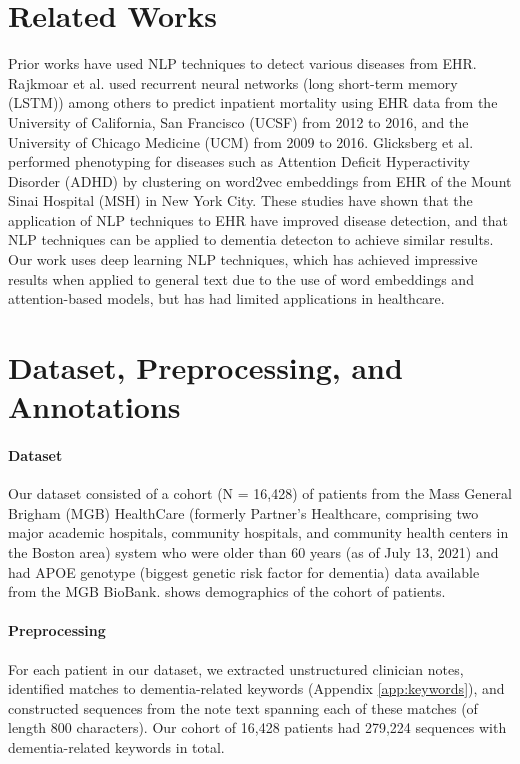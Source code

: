 \documentclass[pmlr,twocolumn,10pt]{jmlr} %
\begin{document}
\section{Related Works}
\label{sec:RelatedWorks} 
Prior works have used NLP techniques to detect various diseases from EHR. Rajkmoar et al. %
used recurrent neural networks (long short-term memory (LSTM)) among others to predict inpatient mortality using EHR data from the University of California, San Francisco (UCSF) from 2012 to 2016, and the University of Chicago Medicine (UCM) from 2009 to 2016.  Glicksberg et al. %
performed phenotyping for diseases such as Attention Deficit Hyperactivity Disorder (ADHD) by clustering on word2vec embeddings from EHR of the Mount Sinai Hospital (MSH) in New York City. These studies have shown that the application of NLP techniques to EHR have improved disease detection, and that NLP techniques can be applied to dementia detecton to achieve similar results. Our work uses deep learning NLP techniques, which has achieved impressive results when applied to general text due to the use of word embeddings and attention-based models, but has had limited applications in healthcare. %

\section{Dataset, Preprocessing, and Annotations}
\label{sec:Dataset+Preprocessing+Annotations}

\paragraph{Dataset}
\label{sec:Dataset} Our dataset consisted of a cohort (N = 16,428) of patients from the Mass General Brigham (MGB) HealthCare (formerly Partner's Healthcare, comprising two major academic hospitals, community hospitals, and community health centers in the Boston area) system who were older than 60 years (as of July 13, 2021) and had APOE genotype (biggest genetic risk factor for dementia) data available from the MGB BioBank.  shows demographics of the cohort of patients.   

\paragraph{Preprocessing}
\label{sec:Preprocessing} For each patient in our dataset, we extracted unstructured clinician notes, identified matches to dementia-related keywords (Appendix \ref{app:keywords}), and constructed sequences from the note text spanning each of these matches (of length 800 characters). Our cohort of 16,428 patients had 279,224 sequences with dementia-related keywords in total. 
\end{document}

